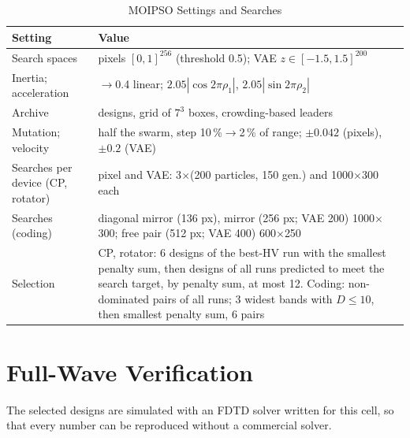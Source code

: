 \documentclass[journal]{IEEEtran}
\begin{document}
\begin{table}[!t]
\caption{MOIPSO Settings and Searches}
\label{tab:moipso}
\centering
\scriptsize
\setlength{\tabcolsep}{3pt}
\begin{tabular}{@{}>{\raggedright\arraybackslash}p{2.3cm}>{\raggedright\arraybackslash}p{5.7cm}@{}}
\toprule
Setting & Value \\
\midrule
Search spaces & pixels $[0,1]^{256}$ (threshold 0.5); VAE $z\in[-1.5,1.5]^{200}$ \\
Inertia; acceleration & 0.9$\to$0.4 linear; $2.05|\cos2\pi\rho_1|$, $2.05|\sin2\pi\rho_2|$ \\
Archive & 50 designs, grid of $7^3$ boxes, crowding-based leaders \\
Mutation; velocity & half the swarm, step 10\,\%$\to$2\,\% of range; $\pm0.042$ (pixels), $\pm0.2$ (VAE) \\
Searches per device (CP, rotator) & pixel and VAE: 3$\times$(200 particles, 150 gen.) and 1000$\times$300 each \\
Searches (coding) & diagonal mirror (136 px), mirror (256 px; VAE 200) 1000$\times$300; free pair (512 px; VAE 400) 600$\times$250 \\
Selection & CP, rotator: 6 designs of the best-HV run with the smallest penalty sum, then designs of all runs predicted to meet the search target, by penalty sum, at most 12. Coding: non-dominated pairs of all runs; 3 widest bands with $D\leq10$, then smallest penalty sum, 6 pairs \\
\bottomrule
\end{tabular}
\end{table}

\section{Full-Wave Verification}\label{sec:fdtd}
The selected designs are simulated with an FDTD solver written for this cell, so that every number can be reproduced without a commercial solver.
\end{document}
